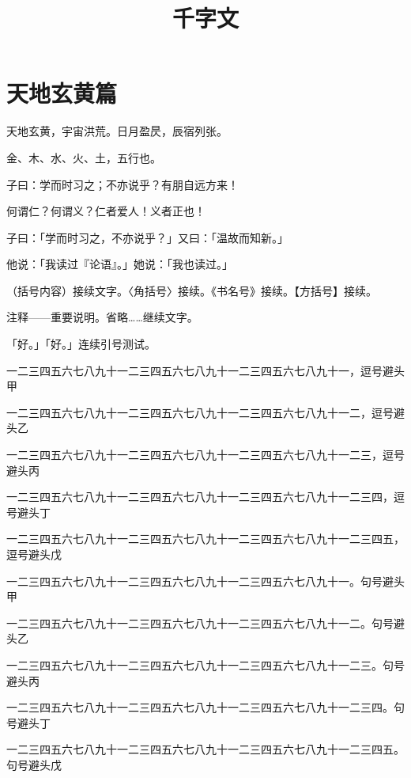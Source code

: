\documentclass{ltc-cn-vbook}
\begin{document}
\title{千字文}
\chapter{天地玄黄篇}

\begin{正文}

天地玄黄，宇宙洪荒。日月盈昃，辰宿列张。

金、木、水、火、土，五行也。

子曰：学而时习之；不亦说乎？有朋自远方来！

何谓仁？何谓义？仁者爱人！义者正也！

子曰：「学而时习之，不亦说乎？」又曰：「温故而知新。」

他说：「我读过『论语』。」她说：「我也读过。」

（括号内容）接续文字。〈角括号〉接续。《书名号》接续。【方括号】接续。

注释——重要说明。省略……继续文字。

「好。」「好。」连续引号测试。


一二三四五六七八九十一二三四五六七八九十一二三四五六七八九十一，逗号避头甲

一二三四五六七八九十一二三四五六七八九十一二三四五六七八九十一二，逗号避头乙

一二三四五六七八九十一二三四五六七八九十一二三四五六七八九十一二三，逗号避头丙

一二三四五六七八九十一二三四五六七八九十一二三四五六七八九十一二三四，逗号避头丁

一二三四五六七八九十一二三四五六七八九十一二三四五六七八九十一二三四五，逗号避头戊

一二三四五六七八九十一二三四五六七八九十一二三四五六七八九十一。句号避头甲

一二三四五六七八九十一二三四五六七八九十一二三四五六七八九十一二。句号避头乙

一二三四五六七八九十一二三四五六七八九十一二三四五六七八九十一二三。句号避头丙

一二三四五六七八九十一二三四五六七八九十一二三四五六七八九十一二三四。句号避头丁

一二三四五六七八九十一二三四五六七八九十一二三四五六七八九十一二三四五。句号避头戊

\end{正文}
\end{document}
